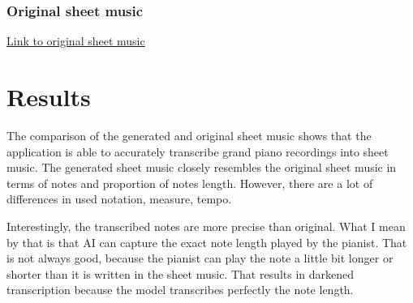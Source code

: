 \documentclass{article}
\begin{document}
\subsubsection{Original sheet music}
\hyperref[fig:original_pathetique]{Link to original sheet music}


\clearpage
\begin{figure}[htbp]
    \centering
    
    \label{fig:generated_chopin}
\end{figure}
\clearpage
\begin{figure}[htbp]
    \centering
    
    \label{fig:original_chopin}
\end{figure}
\clearpage
\begin{figure}[htbp]
    \centering
    
    \label{fig:generated_waldstein}
\end{figure}
\clearpage
\begin{figure}[htbp]
    \centering
    
    \label{fig:original_waldstein}
\end{figure}
\clearpage
\begin{figure}[htbp]
    \centering
    
    \label{fig:generated_pathetique}
\end{figure}
\clearpage
\begin{figure}[htbp]
    \centering
    
    \label{fig:original_pathetique}
\end{figure}




\FloatBarrier
\clearpage
\section{Results}

The comparison of the generated and original sheet music shows that the application is able to accurately transcribe grand piano recordings into sheet music. The generated sheet music closely resembles the original sheet music in terms of notes and proportion of notes length. However, there are a lot of differences in used notation, measure, tempo.

Interestingly, the transcribed notes are more precise than original. What I mean by that is that AI can capture the exact note length played by the pianist. That is not always good, because the pianist can play the note a little bit longer or shorter than it is written in the sheet music. That results in darkened transcription because the model transcribes perfectly the note length.
\end{document}
